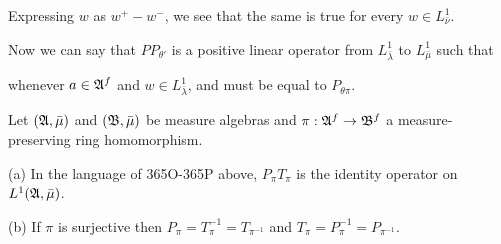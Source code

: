 {
     
\noindent Expressing $w$ as $w^+-w^-$, we see that the same is true for
every $w\in L^1_{\bar\nu}$.\ \Qed
     
Now we can say that $PP_{\theta'}$ is a positive linear operator
from $L^1_{\bar\lambda}$ to $L^1_{\bar\mu}$ such that
     
     
\noindent whenever $a\in\frak A^f$ and $w\in L^1_{\bar\lambda}$, and
must be equal to $P_{\theta\pi}$.
}%
     
 Let $(\frak A,\bar\mu)$ and
$(\frak B,\bar\mu)$ be measure algebras and $\pi:\frak A^f\to\frak B^f$
a measure-preserving ring homomorphism.
     
(a) In the language of 365O-365P above,
$P_{\pi}T_{\pi}$ is the identity operator on $L^1(\frak A,\bar\mu)$.
     
(b) If $\pi$ is surjective then
$P_{\pi}=T_{\pi}^{-1}=T_{\pi^{-1}}$ and
$T_{\pi}=P_{\pi}^{-1}=P_{\pi^{-1}}$.
     
     
